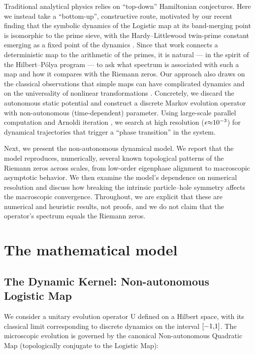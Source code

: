 \documentclass[fleqn,10pt]{wlscirep}
\begin{document}
Traditional analytical physics relies on ``top-down'' Hamiltonian
conjectures. Here we instead take a ``bottom-up'', constructive route,
motivated by our recent finding that the symbolic dynamics of the
Logistic map at its band-merging point is isomorphic to the prime sieve,
with the Hardy--Littlewood twin-prime constant emerging as a fixed point
of the dynamics \cite{wang2026}. Since that work connects a deterministic
map to the arithmetic of the primes, it is natural --- in the spirit of
the Hilbert--P\'olya program --- to ask what spectrum is associated with
such a map and how it compares with the Riemann zeros. Our approach also
draws on the classical observations that simple maps can have complicated
dynamics \cite{may1976} and on the universality of nonlinear transformations
\cite{feigenbaum1978}. Concretely, we discard the autonomous static potential
and construct a discrete Markov evolution operator with non-autonomous
(time-dependent) parameter. Using large-scale parallel computation and
Arnoldi iteration \cite{arpack1998}, we search at high resolution
(\(\text{\ensuremath{\epsilon}\ensuremath{\approx}}\text{10}^{\text{\ensuremath{-}3}}\)) for dynamical trajectories that
trigger a ``phase transition'' in the system.

Next, we present the non-autonomous dynamical model. We report that the
model reproduces, numerically, several known topological patterns of the
Riemann zeros across scales, from low-order eigenphase alignment to
macroscopic asymptotic behavior. We then examine the model's dependence
on numerical resolution and discuss how breaking the intrinsic
particle--hole symmetry affects the macroscopic convergence. Throughout,
we are explicit that these are numerical and heuristic results, not
proofs, and we do not claim that the operator's spectrum equals the
Riemann zeros.

\section*{The mathematical model}

\subsection*{The Dynamic Kernel: Non-autonomous Logistic Map}

We consider a unitary evolution operator \(\text{U}\) defined on a
Hilbert space, with its classical limit corresponding to discrete
dynamics on the interval \(\text{[\ensuremath{-}1,1]}\). The microscopic evolution is
governed by the canonical Non-autonomous Quadratic Map (topologically
conjugate to the Logistic Map):
\end{document}
